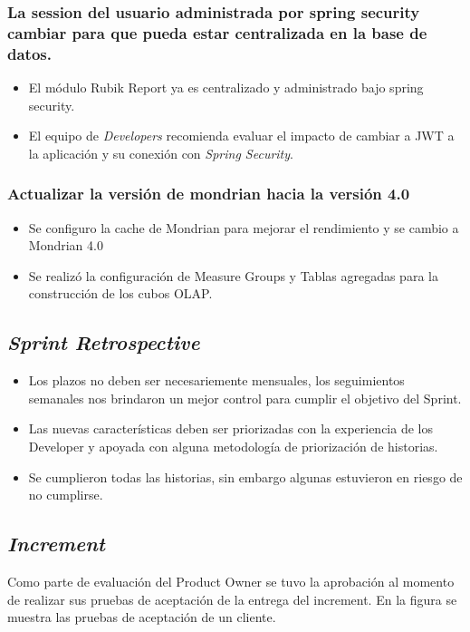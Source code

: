 \begin{spacing}{1.5}
		\subsubsection{La session del usuario administrada por spring security cambiar para que pueda estar centralizada en la base de datos.}
			\begin{itemize}
				\item El m\'{o}dulo Rubik Report ya es centralizado y administrado bajo spring security.
				\item El equipo de \textit{Developers} recomienda evaluar el impacto de cambiar a JWT a la aplicaci\'{o}n y su conexi\'{o}n con \textit{Spring Security}.
			\end{itemize}			
		\subsubsection{Actualizar la versi\'{o}n de mondrian hacia la versi\'{on 4.0}}
		
		\begin{itemize}
			\item Se configuro la cache de Mondrian para mejorar el rendimiento y se cambio a Mondrian 4.0
			\item Se realiz\'{o} la configuraci\'{o}n de Measure Groups y Tablas agregadas para la construcci\'{o}n de los cubos OLAP.
		\end{itemize}	
			
	\subsection{\textit{Sprint Retrospective}}
	\begin{itemize}
		\item Los plazos no deben ser necesariemente mensuales, los seguimientos semanales nos brindaron un mejor control para cumplir el objetivo del Sprint.
		\item Las nuevas caracter\'{i}sticas deben ser priorizadas con la experiencia de los Developer y apoyada con alguna metodolog\'{i}a de priorizaci\'{o}n de historias.
		\item Se cumplieron todas las historias, sin embargo algunas estuvieron en riesgo de no cumplirse.
	\end{itemize}

	\subsection{\textit{Increment}}
	Como parte de evaluaci\'{o}n del Product Owner se tuvo la aprobaci\'{o}n al momento de realizar sus pruebas de aceptaci\'{o}n de la entrega del increment.
	En la figura se muestra las pruebas de aceptaci\'{o}n de un cliente.
	

\end{spacing}
